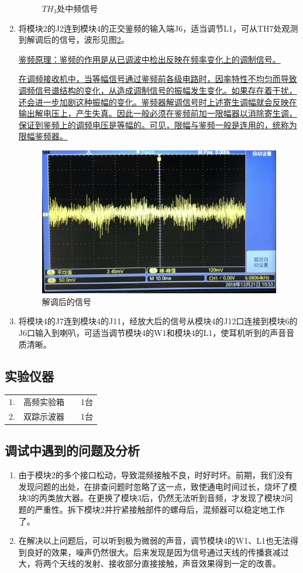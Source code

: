 \documentclass[12pt]{article}%
\numberwithin{equation}{section}
\begin{document}
\begin{enumerate}[1.]
\begin{figure}[htbp]
  \caption{$TH_3$处中频信号 } 
  \label{fig:f8} 
\end{figure}
\item 将模块2的J2连到模块4的正交鉴频的输入端J6，适当调节L1，可从TH7处观测到解调后的信号，波形见图\ref{fig:f9}。\par\uline{鉴频原理：鉴频的作用是从已调波中检出反映在频率变化上的调制信号。}\par\uline{
在调频接收机中，当等幅信号通过鉴频前各级电路时，因率特性不均匀而导致调频信号谱结构的变化，从造成调制信号的振幅发生变化。如果存在着干扰，还会进一步加剧这种振幅的变化。鉴频器解调信号时上述寄生调幅就会反映在输出解电压上，产生失真。因此一般必须在鉴频前加一限幅器以消除寄生调，保证到鉴频上的调频电压是等幅的。可见，限幅与鉴频一般是连用的，统称为限幅鉴频器。}
 \begin{figure}[htbp]
  \centering
  \includegraphics[width=.45\textwidth]{gaopin6/gaopin612.jpg}
  \caption{解调后的信号 } 
  \label{fig:f9} 
\end{figure}
\item 将模块4的J7连到模块4的J11，经放大后的信号从模块4的J12口连接到模块6的J6口输入到喇叭，可适当调节模块4的W1和模块4的L1，使耳机听到的声音音质清晰。
\end{enumerate}

\subsection{实验仪器}
\begin{tabular}{clcc}
1.&	高频实验箱                &&        1台 \\
2.&	双踪示波器           &&             1台\\
\end{tabular}
\subsection{调试中遇到的问题及分析}
\begin{enumerate}[1.]\addtolength{\itemsep}{-1.5ex}
\item 由于模块2的多个接口松动，导致混频接触不良，时好时坏。前期，我们没有发现问题的出处，在排查问题时忽略了这一点，致使通电时间过长，烧坏了模块3的丙类放大器。在更换了模块3后，仍然无法听到音频，才发现了模块2问题的严重性。拆下模块2并拧紧接触部件的螺母后，混频器可以稳定地工作了。
\item 在解决以上问题后，可以听到极为微弱的声音，调节模块4的W1、L1也无法得到良好的效果，噪声仍然很大。后来发现是因为信号通过天线的传播衰减过大，将两个天线的发射、接收部分直接接触，声音效果得到一定的改善。
\end{enumerate}
\end{document}
